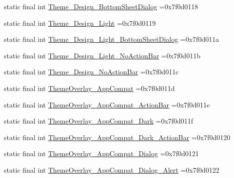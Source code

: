 \begin{DoxyCompactItemize}
\item 
static final int \mbox{\hyperlink{classcom_1_1example_1_1trainawearapplication_1_1_r_1_1style_ad0eb9ada78eeb413ea8e2164f658e1d2}{Theme\+\_\+\+Design\+\_\+\+Bottom\+Sheet\+Dialog}} =0x7f0d0118
\item 
static final int \mbox{\hyperlink{classcom_1_1example_1_1trainawearapplication_1_1_r_1_1style_ab4e7549a066c621d4951cda879cdd9cf}{Theme\+\_\+\+Design\+\_\+\+Light}} =0x7f0d0119
\item 
static final int \mbox{\hyperlink{classcom_1_1example_1_1trainawearapplication_1_1_r_1_1style_aeeb70b98db8037d2988ea13dc0c34dc2}{Theme\+\_\+\+Design\+\_\+\+Light\+\_\+\+Bottom\+Sheet\+Dialog}} =0x7f0d011a
\item 
static final int \mbox{\hyperlink{classcom_1_1example_1_1trainawearapplication_1_1_r_1_1style_a9c7a0216a6b4fa92381e02294931579a}{Theme\+\_\+\+Design\+\_\+\+Light\+\_\+\+No\+Action\+Bar}} =0x7f0d011b
\item 
static final int \mbox{\hyperlink{classcom_1_1example_1_1trainawearapplication_1_1_r_1_1style_ae04b382c7c2dcd9eeabe3edccc261abb}{Theme\+\_\+\+Design\+\_\+\+No\+Action\+Bar}} =0x7f0d011c
\item 
static final int \mbox{\hyperlink{classcom_1_1example_1_1trainawearapplication_1_1_r_1_1style_a3348a9419d2ddc90553c0e82ff9bbbb6}{Theme\+Overlay\+\_\+\+App\+Compat}} =0x7f0d011d
\item 
static final int \mbox{\hyperlink{classcom_1_1example_1_1trainawearapplication_1_1_r_1_1style_afb59edd326cded96476579bd4e218d59}{Theme\+Overlay\+\_\+\+App\+Compat\+\_\+\+Action\+Bar}} =0x7f0d011e
\item 
static final int \mbox{\hyperlink{classcom_1_1example_1_1trainawearapplication_1_1_r_1_1style_aae7c3ae4f3b82315e152289b3ba23aed}{Theme\+Overlay\+\_\+\+App\+Compat\+\_\+\+Dark}} =0x7f0d011f
\item 
static final int \mbox{\hyperlink{classcom_1_1example_1_1trainawearapplication_1_1_r_1_1style_a337289fd0d7b4a0436ba1d4c24fd656d}{Theme\+Overlay\+\_\+\+App\+Compat\+\_\+\+Dark\+\_\+\+Action\+Bar}} =0x7f0d0120
\item 
static final int \mbox{\hyperlink{classcom_1_1example_1_1trainawearapplication_1_1_r_1_1style_a0dc515ea192e010cf5d009f4525eef99}{Theme\+Overlay\+\_\+\+App\+Compat\+\_\+\+Dialog}} =0x7f0d0121
\item 
static final int \mbox{\hyperlink{classcom_1_1example_1_1trainawearapplication_1_1_r_1_1style_aa4412af8127330b06b226b568c3c5744}{Theme\+Overlay\+\_\+\+App\+Compat\+\_\+\+Dialog\+\_\+\+Alert}} =0x7f0d0122

\end{DoxyCompactItemize}
